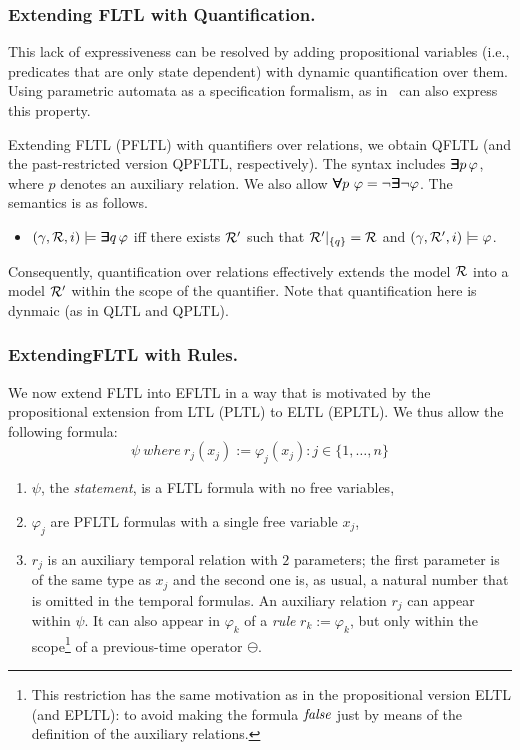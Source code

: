 \subsubsection{Extending FLTL with Quantification.}

This lack of expressiveness can be resolved by
adding propositional variables (i.e., predicates that are
only state dependent) with dynamic quantification over them.
Using parametric automata as a specification formalism, as in~\cite{Grum,havelund-rv-data-2018,Meredith2011,Reger2015} can also express this property.

Extending FLTL (PFLTL) with quantifiers over relations, we obtain QFLTL
(and the past-restricted version QPFLTL, respectively). 
The syntax includes $\bm{\exists}\kern-0.6em\bm{\exists} p \, \varphi$, 
where $p$ denotes an auxiliary relation.
We also allow $\bm{\forall}\kern-0.6em\bm{\forall} p\ \varphi = \neg \bm{\exists}\kern-0.6em\bm{\exists} \neg \varphi$. The semantics is as follows.




\begin{itemize}
\item $(\gamma ,  {\cal R}, i) \models \bm{\exists}\kern-0.6em\bm{\exists} q \, \varphi$ iff there exists
${\cal R}'$ such that ${\cal R}' |_{\{ q \} } = {\cal R}$ and 
$( \gamma, {\cal R}' , i) \models \varphi$.
\end{itemize}
Consequently, quantification over relations effectively extends the model ${\cal R}$ into a model ${\cal R}'$ within the scope of the quantifier. Note that quantification here is dynmaic (as in QLTL and QPLTL).

\subsubsection{ExtendingFLTL  with Rules.}

We now extend FLTL into EFLTL in a way that is motivated by the  propositional extension from LTL (PLTL) to ELTL (EPLTL). We thus allow the following formula:
\begin{equation}
\label{EFLTL}
\psi \mathit{\ where\ } r_j  ( x_j ) := 
\varphi_j (x_j) : j \in \{ 1 , \ldots , n \} 
\end{equation}
\begin{enumerate}
\item $\psi$, the {\em statement}, is a FLTL formula with
no free variables, 
\item $\varphi_j$ are PFLTL formulas with a single
free variable $x_j$,
\item $r_j$ is an auxiliary temporal relation with $2$ parameters; the first parameter is of the same 
type as $x_j$ and the second one is, as usual,
a natural number that is omitted in the temporal formulas. 
An auxiliary relation $r_j$ can appear within $\psi$. It can also appear in $\varphi_k$ of a {\em rule} $r_k := \varphi_k$, but only within the
scope\footnote{This restriction has the same motivation as in
the propositional version ELTL (and EPLTL): to avoid making the
formula $\mathit{false}$ just by means of the definition of the auxiliary relations.}
of a previous-time operator $\ominus$. 
\end{enumerate}


